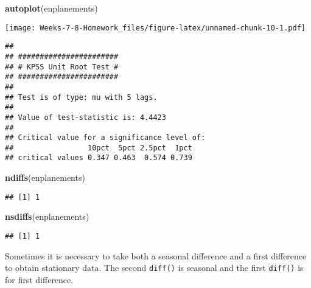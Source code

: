 \documentclass[]{article}
\newenvironment{Shaded}{\begin{snugshade}}{\end{snugshade}}
\newcommand{\KeywordTok}[1]{\textcolor[rgb]{0.13,0.29,0.53}{\textbf{#1}}}
\newcommand{\NormalTok}[1]{#1}
\newcommand{\OperatorTok}[1]{\textcolor[rgb]{0.81,0.36,0.00}{\textbf{#1}}}
\newcommand{\StringTok}[1]{\textcolor[rgb]{0.31,0.60,0.02}{#1}}
\begin{document}
\begin{Shaded}
\begin{Highlighting}[]
\KeywordTok{autoplot}\NormalTok{(enplanements)}
\end{Highlighting}
\end{Shaded}

\texttt{[image: Weeks-7-8-Homework\_files/figure-latex/unnamed-chunk-10-1.pdf]}

\begin{Shaded}
\end{Shaded}

\begin{verbatim}
## 
## ####################### 
## # KPSS Unit Root Test # 
## ####################### 
## 
## Test is of type: mu with 5 lags. 
## 
## Value of test-statistic is: 4.4423 
## 
## Critical value for a significance level of: 
##                 10pct  5pct 2.5pct  1pct
## critical values 0.347 0.463  0.574 0.739
\end{verbatim}

\begin{Shaded}
\begin{Highlighting}[]
\KeywordTok{ndiffs}\NormalTok{(enplanements)}
\end{Highlighting}
\end{Shaded}

\begin{verbatim}
## [1] 1
\end{verbatim}

\begin{Shaded}
\begin{Highlighting}[]
\KeywordTok{nsdiffs}\NormalTok{(enplanements)}
\end{Highlighting}
\end{Shaded}

\begin{verbatim}
## [1] 1
\end{verbatim}

Sometimes it is necessary to take both a seasonal difference and a first
difference to obtain stationary data. The second \texttt{diff()} is
seasonal and the first \texttt{diff()} is for first difference.

\begin{Shaded}
\end{Shaded}
\end{document}
